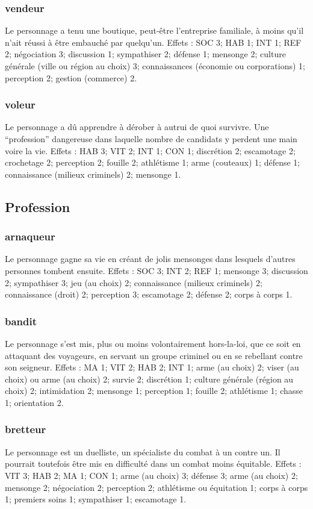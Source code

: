 \documentclass[10pt,a4paper,twocolumn]{book}
\begin{document}
\subsubsection{vendeur}
Le personnage a tenu une boutique, peut-être l’entreprise familiale, à moins qu’il n’ait réussi à être embauché par quelqu’un.
Effets : SOC 3; HAB 1; INT 1; REF 2; négociation  3; discussion 1; sympathiser 2; défense 1; mensonge 2; culture générale (ville ou région au choix) 3; connaissances (économie ou corporations) 1; perception  2; gestion (commerce) 2.
\subsubsection{voleur}
Le personnage a dû apprendre à dérober à autrui de quoi survivre. Une “profession” dangereuse dans laquelle nombre de candidats y perdent une main voire la vie.
Effets : HAB 3; VIT 2; INT 1; CON 1; discrétion 2; escamotage 2; crochetage 2; perception 2; fouille 2; athlétisme 1; arme (couteaux) 1; défense 1; connaissance (milieux criminels) 2; mensonge 1.

\subsection{Profession}
\subsubsection{arnaqueur}
Le personnage gagne sa vie en créant de jolis mensonges dans lesquels d’autres personnes tombent ensuite.
Effets : SOC 3; INT 2; REF 1; mensonge 3; discussion 2; sympathiser 3; jeu (au choix) 2; connaissance (milieux criminels) 2; connaissance (droit) 2; perception 3; escamotage 2; défense 2; corps à corps 1.
\subsubsection{bandit}
Le personnage s’est mis, plus ou moins volontairement hors-la-loi, que ce soit en attaquant des voyageurs, en servant un groupe criminel ou en se rebellant contre son seigneur.
Effets : MA 1; VIT 2; HAB 2; INT 1; arme (au choix) 2; viser (au choix) ou arme (au choix) 2; survie 2; discrétion 1; culture générale (région au choix) 2; intimidation 2; mensonge 1; perception 1; fouille 2; athlétisme 1; chasse 1; orientation 2.
\subsubsection{bretteur}
Le personnage est un duelliste, un spécialiste du combat à un contre un. Il pourrait toutefois être mis en difficulté dans un combat moins équitable.
Effets : VIT 3; HAB 2; MA 1; CON 1; arme (au choix) 3; défense 3; arme (au choix) 2; mensonge 2; négociation 2; perception 2; athlétisme ou équitation 1; corps à corps 1; premiers soins 1; sympathiser 1; escamotage 1.
\end{document}
